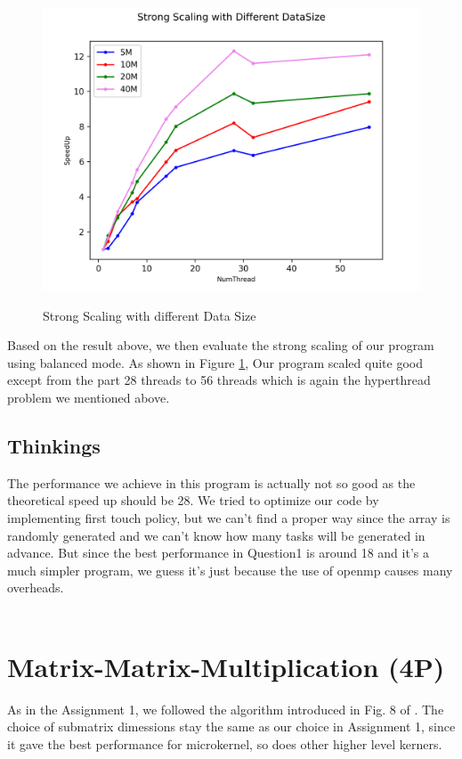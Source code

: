 \documentclass[article]{scrartcl}
\begin{document}
\begin{figure}[htpb]
  \centering
  \includegraphics[width=.8\linewidth]{../figs/quicksort_strongscaling.png}  
  \label{fig:quicksort}
  \caption{Strong Scaling with different Data Size}
\end{figure}

Based on the result above, we then evaluate the strong scaling of our program using balanced mode. As shown in Figure \ref{fig:quicksort},
Our program scaled quite good except from the part 28 threads to 56 threads which is again the hyperthread problem we mentioned above.

\subsection{Thinkings}
The performance we achieve in this program is actually not so good as the theoretical speed up should be 28. We tried to optimize our code by implementing first touch policy,
but we can't find a proper way since the array is randomly generated and we can't know how many tasks will be generated in advance.
But since the best performance in Question1 is around 18 and it's a much simpler program, we guess it's just because the use of openmp causes many overheads.
\\
\\
\section{Matrix-Matrix-Multiplication (4P)}

As in the Assignment 1, we followed the algorithm introduced in Fig. 8 of \cite{Goto08}. The choice of submatrix dimessions stay the same as our choice in Assignment 1, since it gave the best performance for microkernel, so does other higher level kerners. 
\end{document}
